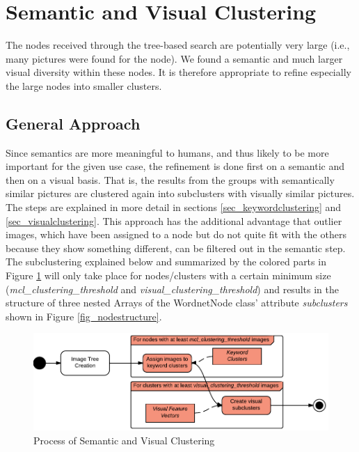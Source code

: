 %
\section{Semantic and Visual Clustering}
\label{sec_inhalt}

The nodes received through the tree-based search are potentially very large (i.e., many pictures were found for the node). We found a semantic and much larger visual diversity within these nodes. It is therefore appropriate to refine especially the large nodes into smaller clusters.

\subsection{General Approach}
Since semantics are more meaningful to humans, and thus likely to be more important for the given use case, the refinement is done first on a semantic and then on a visual basis. That is, the results from the groups with semantically similar pictures are clustered again into subclusters with visually similar pictures. The steps are explained in more detail in sections \ref{sec_keywordclustering} and \ref{sec_visualclustering}.
This approach has the additional advantage that outlier images, which have been assigned to a node but do not quite fit with the others because they show something different, can be filtered out in the semantic step. \\
The subclustering explained below and summarized by the colored parts in Figure \ref{fig_semanticandvisual} will only take place for nodes/clusters with a certain minimum size (\emph{mcl\_clustering\_threshold} and \emph{visual\_clustering\_threshold}) and results in the structure of three nested Arrays of the WordnetNode class' attribute \emph{subclusters} shown in Figure \ref{fig_nodestructure}.

\begin{figure}[h]
\centering
\includegraphics[width=\textwidth]{images/semantic_and_visual_clustering.pdf}
\caption{Process of Semantic and Visual Clustering}
\label{fig_semanticandvisual}
\end{figure}

